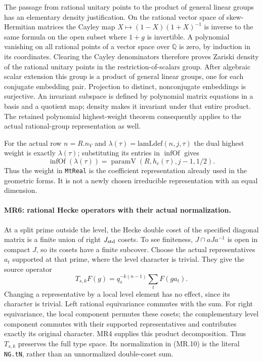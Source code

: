 The passage from rational unitary points to the product of general
linear groups has an elementary density justification. On the
rational vector space of skew-Hermitian matrices the Cayley map
$X\mapsto(1-X)(1+X)^{-1}$ is inverse to the same formula on the
open subset where $1+g$ is invertible. A polynomial vanishing on
all rational points of a vector space over $\mathbb Q$ is zero,
by induction in its coordinates. Clearing the Cayley denominators
therefore proves Zariski density of the rational unitary points in
the restriction-of-scalars group. After algebraic scalar extension
this group is a product of general linear groups, one for each
conjugate embedding pair. Projection to distinct, nonconjugate
embeddings is surjective. An invariant subspace is defined by
polynomial matrix equations in a basis and a quotient map; density
makes it invariant under that entire product. The retained
polynomial highest-weight theorem consequently applies to the
actual rational-group representation as well.

For the actual row $n=R.n_V$ and
$\lambda(\tau)=\mathrm{lamLdef}(n,j,\tau)$ the dual highest
weight is exactly $\lambda(\tau)$; substituting its entries in
$\operatorname{infOf}$ gives
\[
 \operatorname{infOf}(\lambda(\tau))
       =\operatorname{paramV}(R,h_c(\tau),j-1,1/2).   \tag{MR.9}
\]
Thus the weight in \texttt{MtReal} is the coefficient representation
already used in the geometric forms. It is not a newly chosen
irreducible representation with an equal dimension.

\paragraph{MR6: rational Hecke operators with their actual normalization.}
At a split prime outside the level, the Hecke double coset of the
specified diagonal matrix is a finite union of right $J_{\rm std}$
cosets. To see finiteness, $J\cap aJa^{-1}$ is open in compact $J$,
so its cosets have a finite subcover. Choose the actual representatives
$a_t$ supported at that prime, where the level character is trivial.
They give the source operator
\[
       T_{s,k}F(g)=q_s^{-k(n-1)}\sum_t F(ga_t).        \tag{MR.10}
\]
Changing a representative by a local level element has no effect,
since its character is trivial. Left rational equivariance commutes
with the sum. For right equivariance, the local component permutes
these cosets; the complementary level component commutes with
their supported representatives and contributes exactly its original
character. MR4 supplies this product decomposition. Thus
$T_{s,k}$ preserves the full type space.
Its normalization in (MR.10) is the literal \texttt{NG.tN}, rather
than an unnormalized double-coset sum.

